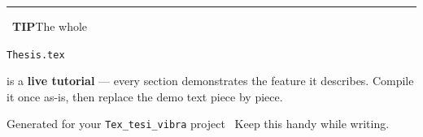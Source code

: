 \documentclass[11pt]{article}
\newcommand{\marker}[2]{\textcolor{#1}{\rule[0.05em]{0.7em}{0.7em}}~\textbf{\textcolor{#1}{#2}}}
\newcommand{\code}[1]{%
  \colorbox{codebg}{\rule[-0.2em]{0pt}{1em}\texttt{\small #1}}}
\begin{document}
\begin{tip}
\marker{green!45!black}{TIP}\quad The whole \code{Thesis.tex} is a \textbf{live tutorial} --- every section
demonstrates the feature it describes. Compile it once as-is, then replace the demo
text piece by piece.
\end{tip}

\vfill
\begin{center}
{\color{soft}\small Generated for your \texttt{Tex\_tesi\_vibra} project \textbullet\ Keep this handy while writing.}
\end{center}
\end{document}
